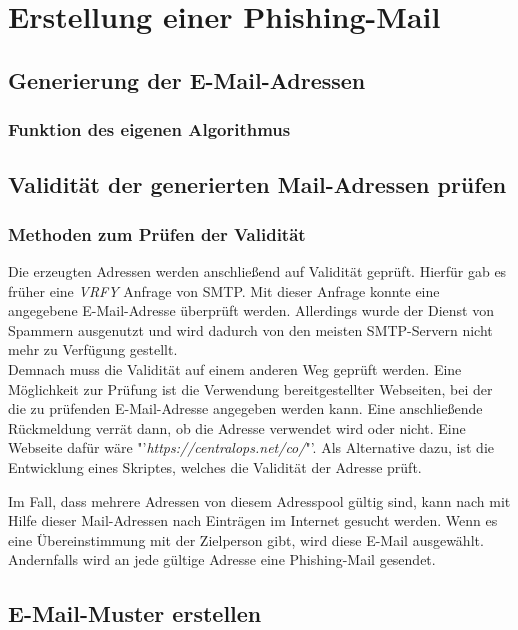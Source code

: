 
\chapter{Erstellung einer Phishing-Mail}  %
\label{cha:Erstellung einer Phishing-Mail} %

\section{Generierung der E-Mail-Adressen}
	\subsection{Funktion des eigenen Algorithmus}
\section{Validität der generierten Mail-Adressen prüfen}
	\subsection{Methoden zum Prüfen der Validität}
	Die erzeugten Adressen werden anschließend auf Validität geprüft. Hierfür gab es früher eine \textit{VRFY} Anfrage von SMTP. Mit dieser Anfrage konnte eine angegebene E-Mail-Adresse überprüft werden. Allerdings wurde der Dienst von Spammern ausgenutzt und wird dadurch von den meisten SMTP-Servern nicht mehr zu Verfügung gestellt.\cite{balduzzi2010abusing}\\
	Demnach muss die Validität auf einem anderen Weg geprüft werden. Eine Möglichkeit zur Prüfung ist die Verwendung bereitgestellter Webseiten, bei der die zu prüfenden E-Mail-Adresse angegeben werden kann. Eine anschließende Rückmeldung verrät dann, ob die Adresse verwendet wird oder nicht. Eine Webseite dafür wäre "'\textit{https://centralops.net/co/}"'. Als Alternative dazu, ist die Entwicklung eines Skriptes, welches die Validität der Adresse prüft.
	
	Im Fall, dass mehrere Adressen von diesem Adresspool gültig sind, kann nach mit Hilfe dieser Mail-Adressen nach Einträgen im Internet gesucht werden. Wenn es eine Übereinstimmung mit der Zielperson gibt, wird diese E-Mail ausgewählt. Andernfalls wird an jede gültige Adresse eine Phishing-Mail gesendet. 
\section{E-Mail-Muster erstellen}
